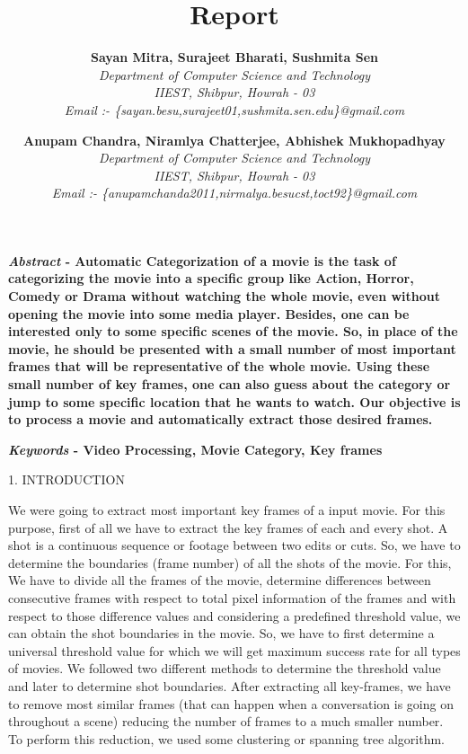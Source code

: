 \documentclass[twocolumn,twoside]{article}
\title{\vspace{0.2cm}\huge\bf Report\vspace{1.2cm}}
\author{
			{\normalsize \bf Sayan Mitra, Surajeet Bharati, Sushmita Sen}\\
			{\small \textit{Department of Computer Science and Technology}}\\
			{\small \textit{IIEST, Shibpur, Howrah - 03}}\\
			{\small \textit{Email :- \{sayan.besu,surajeet01,sushmita.sen.edu\}@gmail.com }}\\
			\and
			{\normalsize \bf Anupam Chandra, Niramlya Chatterjee, Abhishek Mukhopadhyay}\\
			{\small \textit{Department of Computer Science and Technology}}\\
			{\small \textit{IIEST, Shibpur, Howrah - 03}}\\
			{\small \textit{Email :- \{anupamchanda2011,nirmalya.besucst,toct92\}@gmail.com }}
}
\date{}
\begin{document}
		\maketitle

		{\bf \textit{Abstract} - Automatic Categorization of a movie is the task of categorizing the movie into a specific group like Action, Horror, Comedy or Drama without watching the whole movie, even without opening the movie into some media player. Besides, one can be interested only to some specific scenes of the movie. So, in place of the movie, he should be presented with a small number of most important frames that will be representative of the whole movie. Using these small number of key frames, one can also guess about the category or jump to some specific location that he wants to watch. Our objective is to process a movie and automatically extract those desired frames.}
		
		
		
		\vspace{0.3cm}
		{\bf \textit{Keywords} - Video Processing, Movie Category, Key frames}
		
		
		\vspace{0.7cm}
		\begin{center}
		    {\large 1. INTRODUCTION}
		\end{center} 
		\vspace{0.3cm}
			
    We were going to extract most important key frames of a input movie. For this purpose, first of all we have to extract the key frames of each and every shot. A shot is a continuous sequence or footage between two edits or cuts. So, we have to determine the boundaries (frame number) of all the shots of the movie. For this, We have to divide all the frames of the movie, determine differences between consecutive frames with respect to total pixel information of the frames and with respect to those difference values and considering a predefined threshold value, we can obtain the shot boundaries in the movie. So, we have to first determine a universal threshold value for which we will get maximum success rate for all types of movies. We followed two different methods to determine the threshold value and later to determine shot boundaries. After extracting all key-frames, we have to remove most similar frames (that can happen when a conversation is going on throughout a scene) reducing the number of frames to a much smaller number. To perform this reduction, we used some clustering or spanning tree algorithm.\\
		
\end{document}
